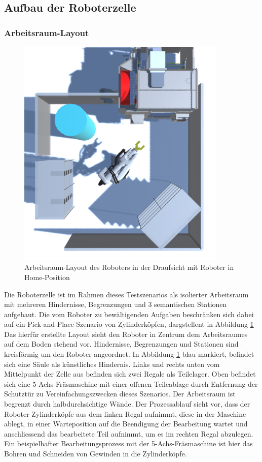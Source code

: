 \subsection{Aufbau der Roboterzelle}
\label{sec:aufbauTestszenario}

\subsubsection{Arbeitsraum-Layout}

\begin{figure}[H]
	\centering
	\includegraphics[width=10cm]{Figures/Roboterzelle.png}
	\caption{Arbeitsraum-Layout des Roboters in der Draufsicht mit Roboter in
		Home-Position}
	\label{figure:arbeitsraum}
\end{figure}

Die Roboterzelle ist im Rahmen dieses Testszenarios als isolierter Arbeitsraum
mit mehreren Hindernisse, Begrenzungen und 3 semantischen Stationen aufgebaut.
Die vom Roboter zu bewältigenden Aufgaben beschränken sich dabei auf ein
Pick-and-Place-Szenario von Zylinderköpfen, dargstellent in Abbildung
\ref{figure:arbeitsraum}
\noindent
Das hierfür erstellte Layout sieht den Roboter in Zentrum dem Arbeitsraumes auf
dem Boden stehend vor. Hindernisse, Begrenzungen und Stationen sind kreisförmig
um den Roboter angeordnet. In Abbildung
\ref{figure:arbeitsraum}
blau markiert, befindet sich eine Säule als künstliches Hindernis. Links und rechts unten vom Mittelpunkt der Zelle aus befinden sich
zwei Regale als Teilelager. Oben befindet sich eine 5-Achs-Fräsmaschine mit
einer offenen Teileablage durch Entfernung der Schutztür zu
Vereinfachungszwecken dieses Szenarios. Der Arbeitsraum ist begrenzt durch
halbdurchsichtige Wände. Der Prozessablauf sieht vor, dass der Roboter
Zylinderköpfe aus dem linken Regal aufnimmt, diese in der Maschine ablegt, in
einer Warteposition auf die Beendigung der Bearbeitung wartet und anschliessend
das bearbeitete Teil aufnimmt, um es im rechten Regal abzulegen. Ein
beispielhafter Bearbeitungsprozess mit der 5-Achs-Fräsmaschine ist hier das Bohren und Schneiden von Gewinden
in die Zylinderköpfe.

